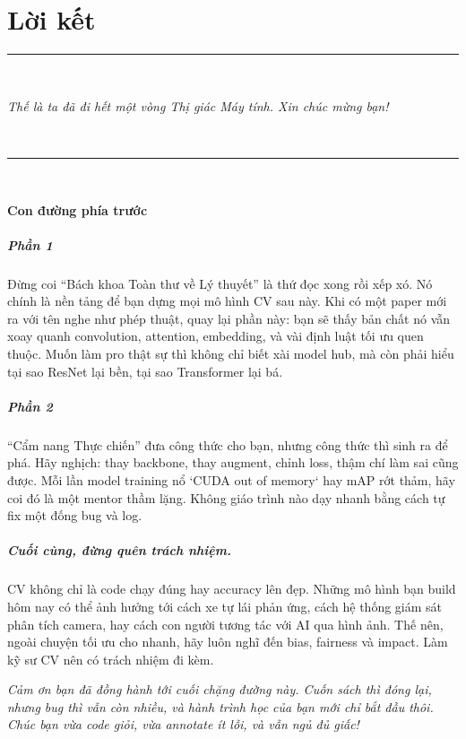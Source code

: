 \chapter*{Lời kết}

\begin{center}
	\vspace*{4cm}
	\rule{0.8\textwidth}{0.4pt} \\[0.8cm]
	\parbox{0.9\textwidth}{
		\centering
		\textit{
			Thế là ta đã đi hết một vòng Thị giác Máy tính. Xin chúc mừng bạn!
		}
	} \\[1cm]
	
	\rule{0.8\textwidth}{0.4pt} \\[2cm]
\end{center}

\noindent
\textbf{Con đường phía trước}

\paragraph{Phần 1}  
Đừng coi “Bách khoa Toàn thư về Lý thuyết” là thứ đọc xong rồi xếp xó.  
Nó chính là nền tảng để bạn dựng mọi mô hình CV sau này.  
Khi có một paper mới ra với tên nghe như phép thuật, quay lại phần này:  
bạn sẽ thấy bản chất nó vẫn xoay quanh convolution, attention, embedding,  
và vài định luật tối ưu quen thuộc. Muốn làm pro thật sự thì không chỉ biết xài model hub,  
mà còn phải hiểu tại sao ResNet lại bền, tại sao Transformer lại bá.  

\paragraph{Phần 2}  
“Cẩm nang Thực chiến” đưa công thức cho bạn, nhưng công thức thì sinh ra để phá.  
Hãy nghịch: thay backbone, thay augment, chỉnh loss, thậm chí làm sai cũng được.  
Mỗi lần model training nổ `CUDA out of memory` hay mAP rớt thảm, hãy coi đó là một mentor thầm lặng.  
Không giáo trình nào dạy nhanh bằng cách tự fix một đống bug và log.

\paragraph{Cuối cùng, đừng quên trách nhiệm.}  
CV không chỉ là code chạy đúng hay accuracy lên đẹp.  
Những mô hình bạn build hôm nay có thể ảnh hưởng tới cách xe tự lái phản ứng,  
cách hệ thống giám sát phân tích camera, hay cách con người tương tác với AI qua hình ảnh.  
Thế nên, ngoài chuyện tối ưu cho nhanh, hãy luôn nghĩ đến bias, fairness và impact.  
Làm kỹ sư CV nên có trách nhiệm đi kèm.

\vfill

\begin{center}
	\parbox{0.9\textwidth}{
		\centering
		{\itshape
			Cảm ơn bạn đã đồng hành tới cuối chặng đường này.  
			Cuốn sách thì đóng lại, nhưng bug thì vẫn còn nhiều, và hành trình học của bạn mới chỉ bắt đầu thôi.  
			Chúc bạn vừa code giỏi, vừa annotate ít lỗi, và vẫn ngủ đủ giấc!
		}
	}
\end{center}
